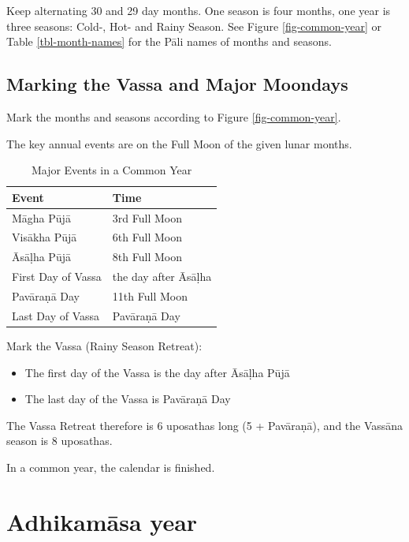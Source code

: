 \documentclass[11pt,oneside]{memoir-article}
\begin{document}
Keep alternating 30 and 29 day months. One season is four months, one year is
three seasons: Cold-, Hot- and Rainy Season. See Figure \ref{fig-common-year} or
Table \ref{tbl-month-names} for the Pāli names of months and seasons.

\subsection{Marking the Vassa and Major Moondays}
\label{sec-1-2-2}
\label{marking-the-moondays-common-year}

Mark the months and seasons according to Figure \ref{fig-common-year}.

The key annual events are on the Full Moon of the given lunar months.

\begin{table}[h]
\caption{\label{tbl-major-events} Major Events in a Common Year}
\centering
\begin{tabular}{ll}
Event & Time\\
\hline
Māgha Pūjā & 3rd Full Moon\\
Visākha Pūjā & 6th Full Moon\\
Āsāḷha Pūjā & 8th Full Moon\\
First Day of Vassa & the day after Āsāḷha\\
Pavāraṇā Day & 11th Full Moon\\
Last Day of Vassa & Pavāraṇā Day\\
\end{tabular}
\end{table}

Mark the Vassa (Rainy Season Retreat):

\begin{itemize}
\item The first day of the Vassa is the day after Āsāḷha Pūjā
\item The last day of the Vassa is Pavāraṇā Day
\end{itemize}

\enlargethispage{2\baselineskip}

The Vassa Retreat therefore is 6 uposathas long (5 + Pavāraṇā), and the Vassāna
season is 8 uposathas.

In a common year, the calendar is finished. 

\clearpage

\section{Adhikamāsa year}
\label{sec-1-3}
\end{document}
